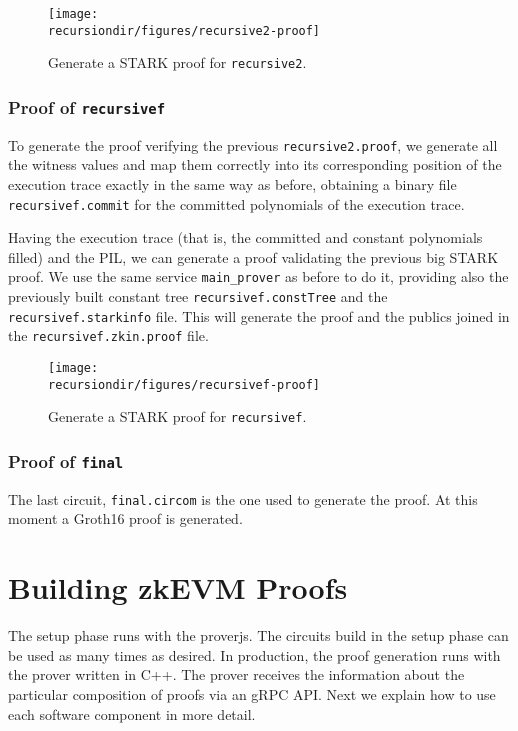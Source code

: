 \begin{figure}[H]
\centering
\texttt{[image: \\recursiondir/figures/recursive2-proof]}
\caption{Generate a STARK proof for \texttt{recursive2}.}
\label{fig:recursive2-proof}
\end{figure}


\subsubsection{Proof of \texttt{recursivef}}

To generate the proof verifying the previous \texttt{recursive2.proof}, we generate all the witness values and map them correctly into its corresponding position of the execution trace exactly in the same way as before, obtaining a binary file \texttt{recursivef.commit} for the committed polynomials of the execution trace. 

Having the execution trace (that is, the committed and constant polynomials filled) and the PIL, we can generate a proof validating the previous big STARK proof. We use the same service \texttt{main\_prover} as before to do it, providing also the previously built constant tree \texttt{recursivef.constTree} and the \texttt{recursivef.starkinfo} file. This will generate the proof and the publics joined in the \texttt{recursivef.zkin.proof} file. 


\begin{figure}[H]
\centering
\texttt{[image: \\recursiondir/figures/recursivef-proof]}
\caption{Generate a STARK proof for \texttt{recursivef}.}
\label{fig:recursivef-proof}
\end{figure}



\subsubsection{Proof of \texttt{final}}

The last circuit, \texttt{final.circom} is the one used to generate the proof.
At this moment a Groth16 proof is generated.


\section{Building zkEVM Proofs}

The setup phase runs with the proverjs. 
The circuits build in the setup phase can be used as many times
as desired.
In production, the proof generation runs with the prover written in C++.
The prover receives the information about the particular composition of 
proofs via an gRPC API.
Next we explain how to use each software component in more detail.

